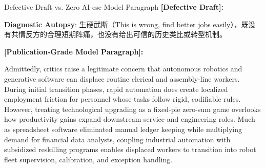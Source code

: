 \begin{ExampleBox}{Defective Draft vs. Zero AI-ese Model Paragraph}
\textbf{\color{TargetHighlight}[Defective Draft]:}\par
{}\par\vspace{4pt}
\textbf{Diagnostic Autopsy}: 生硬武断（This is wrong, find better jobs easily），既没有共情反方的合理短期阵痛，也没有给出可信的历史类比或转型机制。\par\vspace{6pt}
\textbf{\color{AcadNavy}[Publication-Grade Model Paragraph]:}\par
Admittedly, critics raise a legitimate concern that autonomous robotics and generative software can displace routine clerical and assembly-line workers. During initial transition phases, rapid automation does create localized employment friction for personnel whose tasks follow rigid, codifiable rules. However, treating technological upgrading as a fixed-pie zero-sum game overlooks how productivity gains expand downstream service and engineering roles. Much as spreadsheet software eliminated manual ledger keeping while multiplying demand for financial data analysts, coupling industrial automation with subsidized reskilling programs enables displaced workers to transition into robot fleet supervision, calibration, and exception handling.
\end{ExampleBox}
